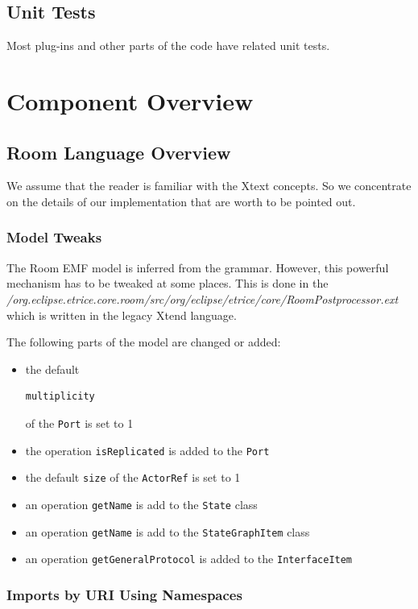 \subsection{Unit Tests}

Most plug-ins and other parts of the code have related unit tests.

\section{Component Overview}

\subsection{Room Language Overview}

We assume that the reader is familiar with the Xtext concepts. So we concentrate on the details of our 
implementation that are worth to be pointed out.

\subsubsection{Model Tweaks}

The Room EMF model is inferred from the grammar. However, this powerful mechanism has to be tweaked at 
some places.
This is done in the 
\textit{/org.eclipse.etrice.core.room/src/org/eclipse/etrice/core/RoomPostprocessor.ext} which is written 
in the legacy Xtend language.

The following parts of the model are changed or added:
\begin{itemize}
\item the default \begin{verbatim}multiplicity\end{verbatim} of the \texttt{Port} is set to 1
\item the operation \texttt{isReplicated} is added to the \texttt{Port}
\item the default \texttt{size} of the \texttt{ActorRef} is set to 1
\item an operation \texttt{getName} is add to the \texttt{State} class
\item an operation \texttt{getName} is add to the \texttt{StateGraphItem} class
\item an operation \texttt{getGeneralProtocol} is added to the \texttt{InterfaceItem}
\end{itemize}

\subsubsection{Imports by URI Using Namespaces}

